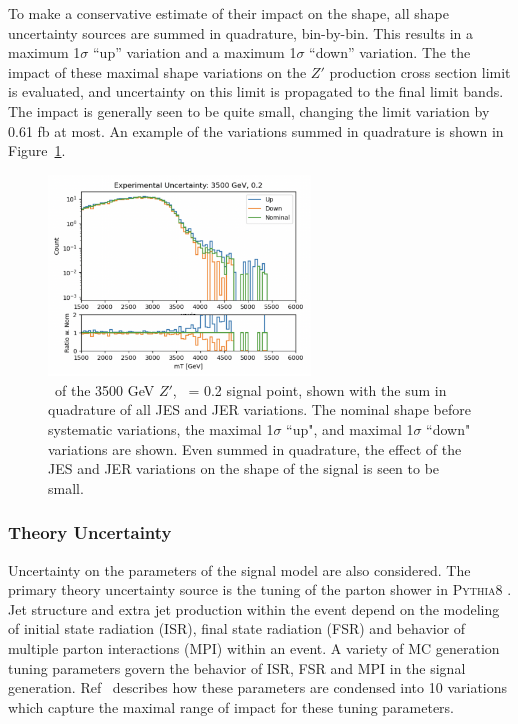 To make a conservative estimate of their impact on the shape, all shape uncertainty sources are summed in quadrature, bin-by-bin.
This results in a maximum 1$\sigma$ ``up'' variation and a maximum 1$\sigma$ ``down'' variation. 
The the impact of these maximal shape variations on the $Z'$ production cross section limit is evaluated, and uncertainty on this limit is propagated to the final limit bands. 
The impact is generally seen to be quite small, changing the limit variation by 0.61 fb at most. 
An example of the variations summed in quadrature is shown in Figure~\ref{fig:jetcp_sumq}. 
\begin{figure}[!htbp]
\centering
   \includegraphics[width=0.62\textwidth]{figures/results/jetcp_sumq}
    \caption{\mt~of the 3500 GeV $Z'$, \rinv~= 0.2 signal point, shown with the sum in quadrature of all JES and JER variations. The nominal shape before systematic variations, the maximal 1$\sigma$ ``up", and maximal 1$\sigma$ ``down" variations are shown. Even summed in quadrature, the effect of the JES and JER variations on the shape of the signal is seen to be small.
    \label{fig:jetcp_sumq}}
\end{figure}

\subsubsection{Theory Uncertainty}
Uncertainty on the parameters of the signal model are also considered. 
The primary theory uncertainty source is the tuning of the parton shower in \textsc{Pythia8} \cite{parton_shower}. 
Jet structure and extra jet production within the event depend on the modeling of initial state radiation (ISR), final state radiation (FSR) and behavior of multiple parton interactions (MPI) within an event.
A variety of MC generation tuning parameters govern the behavior of ISR, FSR and MPI in the signal generation.
Ref~\cite{pythia8_tunes} describes how these parameters are condensed into 10 variations which capture the maximal range of impact for these tuning parameters. 

